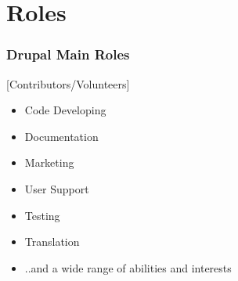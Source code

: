 \section{Roles}

\begin{frame}[allowframebreaks]
\frametitle{Drupal Main Roles}

[Contributors/Volunteers]

    \begin{itemize}
    	\item Code Developing
    	\item Documentation
    	\item Marketing
    	\item User Support
    	\item Testing
    	\item Translation
    	\item ..and a wide range of abilities and interests
	\end{itemize}
\end{frame}

